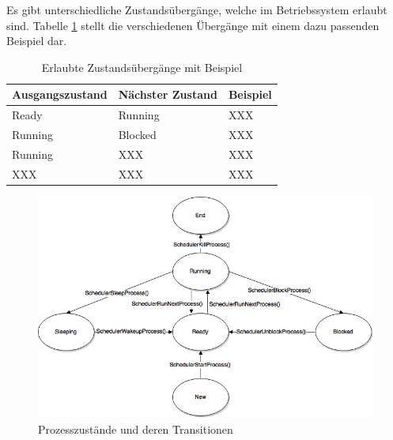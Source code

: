Es gibt unterschiedliche Zustandsübergänge, welche im Betriebssystem erlaubt sind. Tabelle \ref{table:State-transition} stellt die verschiedenen Übergänge mit einem dazu passenden Beispiel dar.

\begin{table}[H]
\begin{tabular}{p{3cm} | p{3cm} | p{6cm}}
  \textbf{Ausgangszustand} & \textbf{Nächster Zustand} & \textbf{Beispiel} 
  \\ \hline
  Ready & Running & XXX \\
  Running & Blocked & XXX \\
  Running & XXX & XXX \\
  XXX & XXX & XXX \\
  
 \end{tabular}
 \caption{Erlaubte Zustandsübergänge mit Beispiel}
 \label{table:State-transition}
\end{table}


\begin{figure}[H]
	\includegraphics[scale=0.60]{chapters/processmanagement/figures/StateTransition}
	\caption{Prozesszustände und deren Transitionen}
	\label{fig:StateTransition}
\end{figure}


